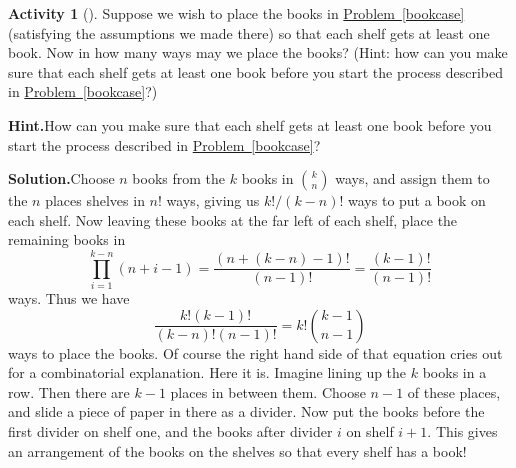 \documentclass[10pt,]{book}
\theoremstyle{plain}
\theoremstyle{definition}
\newtheorem{activity}[project]{Activity}
\numberwithin{equation}{chapter}
\begin{document}
\begin{activity}[]\label{activity-113}
Suppose we wish to place the books in \hyperref[bookcase]{Problem~\ref{bookcase}} (satisfying the assumptions we made there) so that each shelf gets at least one book. Now in how many ways may we place the books? (Hint: how can you make sure that each shelf gets at least one book before you start the process described in \hyperref[bookcase]{Problem~\ref{bookcase}}?)%
\par\medskip\noindent%
\textbf{Hint.}\quad How can you make sure that each shelf gets at least one book before you start the process described in \hyperref[bookcase]{Problem~\ref{bookcase}}?%
\par\medskip\noindent%
\textbf{Solution.}\quad Choose \(n\) books from the \(k\) books in \(\binom{k}{n}\) ways, and assign them to the \(n\) places shelves in \(n!\) ways, giving us \(k!/(k-n)!\) ways to put a book on each shelf. Now leaving these books at the far left of each shelf, place the remaining books in%
\begin{equation*}
\prod_{i=1}^{k-n}
(n+i-1)=\frac{(n+(k-n)-1)!}{(n-1)!}=\frac{(k-1)!}{(n-1)!}
\end{equation*}
ways. Thus we have%
\begin{equation*}
\frac{k!(k-1)!}{(k-n)!(n-1)!}=k!\binom{k-1}{n-1}
\end{equation*}
ways to place the books. Of course the right hand side of that equation cries out for a combinatorial explanation. Here it is. Imagine lining up the \(k\) books in a row. Then there are \(k-1\) places in between them. Choose \(n-1\) of these places, and slide a piece of paper in there as a divider. Now put the books before the first divider on shelf one, and the books after divider \(i\) on shelf \(i+1\). This gives an arrangement of the books on the shelves so that every shelf has a book!%
\end{activity}
\end{document}
